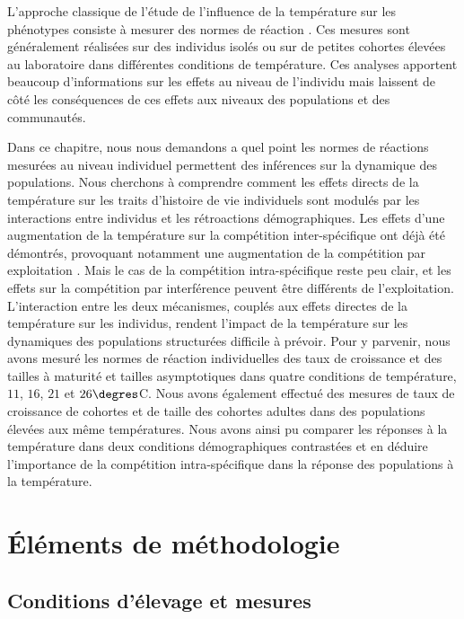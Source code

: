 L'approche classique de l'étude de l'influence de la température sur les
phénotypes consiste à mesurer des normes de réaction \autocites{woltereck1909a}.
Ces mesures sont généralement réalisées sur des individus isolés ou sur de
petites cohortes élevées au laboratoire dans différentes conditions de
température. Ces analyses apportent beaucoup d'informations sur les effets au
niveau de l'individu mais laissent de côté les conséquences de ces effets aux
niveaux des populations et des communautés. 

Dans ce chapitre, nous nous demandons a quel point les normes de réactions
mesurées au niveau individuel permettent des inférences sur la dynamique des
populations. Nous cherchons à comprendre comment les effets directs de la
température sur les traits d'histoire de vie individuels sont modulés par les
interactions entre individus et les rétroactions démographiques.
Les effets d'une augmentation de la température sur la compétition
inter-spécifique ont déjà été démontrés, provoquant notamment une augmentation
de la compétition par exploitation \autocites{ohlberger2011a}. Mais le cas de la
compétition intra-spécifique reste peu clair, et les effets sur la compétition par
interférence peuvent être différents de l'exploitation. L'interaction entre
les deux mécanismes, couplés aux effets directes de la température sur les individus,
rendent l'impact de la température sur les dynamiques des populations
structurées difficile à prévoir. Pour y parvenir, nous avons mesuré les normes de réaction
individuelles des taux de croissance et des tailles à maturité et tailles
asymptotiques dans quatre conditions de température, $11$, $16$, $21$ et
$26\degres$C. Nous avons également effectué des mesures de taux de croissance de
cohortes et de taille des cohortes adultes dans des populations élevées aux même
températures. Nous avons ainsi pu comparer les réponses à la température dans
deux conditions démographiques contrastées et en déduire l'importance de la
compétition intra-spécifique dans la réponse des populations à la température.

\section{Éléments de méthodologie}

\subsection{Conditions d'élevage et mesures}

